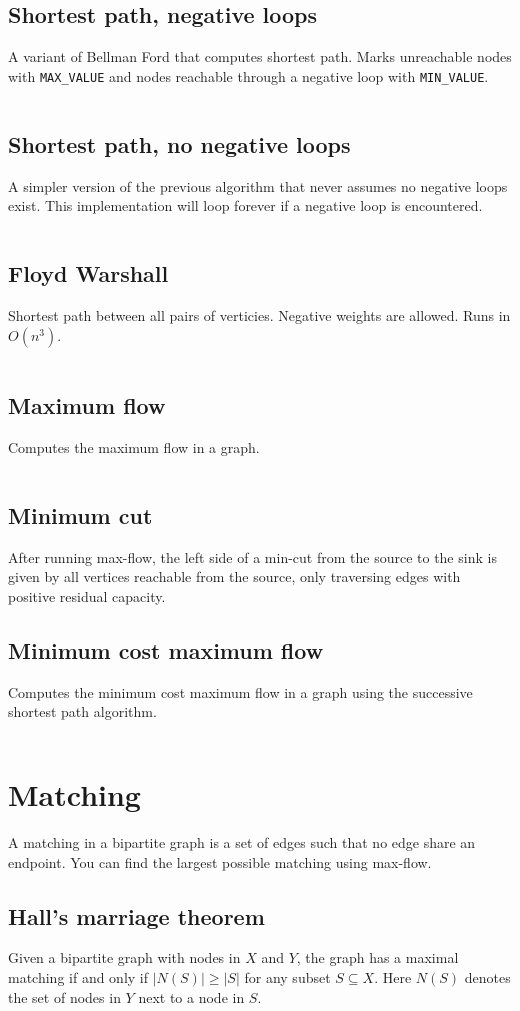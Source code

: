 \documentclass[10pt,a4paper,landscape,oneside]{amsart}
\newcommand{\code}[1]{\inputminted[fontsize=\large,tabsize=2,baselinestretch=1]{java}{#1}}
\begin{document}
\begin{multicols*}{2}
\subsection{Shortest path, negative loops}
A variant of Bellman Ford that computes shortest path. Marks unreachable nodes with
\verb|MAX_VALUE| and nodes reachable through a negative loop with \verb|MIN_VALUE|.
\code{graph/shortest-path.java}
\subsection{Shortest path, no negative loops}
A simpler version of the previous algorithm that never assumes no negative loops exist.
This implementation will loop forever if a negative loop is encountered.
\code{graph/shortest-path-noloop.java}
\subsection{Floyd Warshall}
Shortest path between all pairs of verticies. Negative weights are allowed. Runs in
\(O(n^3)\).
\code{graph/floyd-warshall.java}
\subsection{Maximum flow}
Computes the maximum flow in a graph.
\code{graph/max-flow.java}
\subsection{Minimum cut}
After running max-flow, the left side of a min-cut from the source to the sink is given
by all vertices reachable from the source, only traversing edges with positive residual
capacity.
\subsection{Minimum cost maximum flow}
Computes the minimum cost maximum flow in a graph using the successive shortest path
algorithm.
\code{graph/min-cost-max-flow.java}

\section{Matching}
A matching in a bipartite graph is a set of edges such that no edge share an endpoint.
You can find the largest possible matching using max-flow.
\subsection{Hall's marriage theorem}
Given a bipartite graph with nodes in \(X\) and \(Y\), the graph has a maximal matching
if and only if \(|N(S)| \geq |S|\) for any subset \(S \subseteq X\). Here \(N(S)\)
denotes the set of nodes in \(Y\) next to a node in \(S\).

\end{multicols*}
\end{document}
